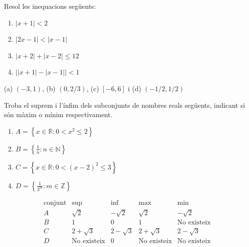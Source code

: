 \begin{exercici}
Resol les inequacions següents:

\begin{enumerate}
\item[a)] $\left\vert x+1\right\vert <2$

\item[b)] $\left\vert 2x-1\right\vert <\left\vert x-1\right\vert $

\item[c)] $\left\vert x+2\right\vert +\left\vert x-2\right\vert \leq 12$

\item[d)] $\left\vert \left\vert x+1\right\vert -\left\vert x-1\right\vert
\right\vert <1$
\end{enumerate}

\end{exercici}

\begin{indicacio}
(a) $(-3,1)$, (b) $(0,2/3)$, (c) $[-6,6]$ i (d) $(-1/2,1/2)$
\end{indicacio}

\begin{exercici}
Troba el suprem i l’ínfim dels subconjunts de nombres reals següents, indicant si són màxim o mínim respectivament.

\begin{enumerate}
\item[a)] $A=\left\{ x\in \mathbb{R}:0<x^{2}\leq 2\right\} $

\item[b)] $B=\left\{ \frac{1}{n}:n\in \mathbb{N}\right\} $

\item[c)] $C=\left\{ x\in \mathbb{R}:0<(x-2)^{2}\leq 3\right\} $

\item[d)] $D=\left\{ \frac{1}{3^{m}}:m\in \mathbb{Z}\right\} $
\end{enumerate}

\end{exercici}

\begin{indicacio}
%
\[
\begin{array}{ccccc}
\text{conjunt} & \sup & \inf & \max & \min \\ 
A & \sqrt{2} & -\sqrt{2} & \sqrt{2} & -\sqrt{2} \\ 
B & 1 & 0 & 1 & \text{No existeix} \\ 
C & 2+\sqrt{3} & 2-\sqrt{3} & 2+\sqrt{3} & 2-\sqrt{3} \\ 
D & \text{No existeix} & 0 & \text{No existeix} & \text{No existeix}%
\end{array}%
\]
\end{indicacio}

